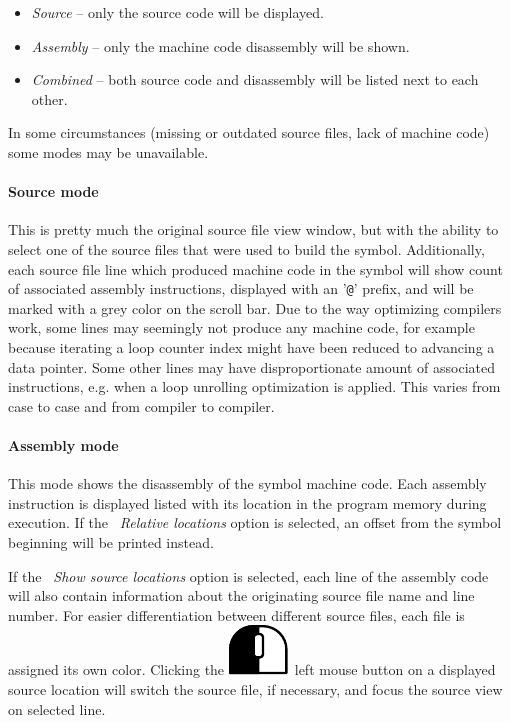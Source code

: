 \documentclass[hidelinks,titlepage,a4paper]{article}
\newcommand{\LMB}{\includegraphics[height=.8\baselineskip]{icons/lmb}}
\begin{document}
\begin{itemize}
\item \emph{Source} -- only the source code will be displayed.
\item \emph{Assembly} -- only the machine code disassembly will be shown.
\item \emph{Combined} -- both source code and disassembly will be listed next to each other.
\end{itemize}

In some circumstances (missing or outdated source files, lack of machine code) some modes may be unavailable.

\paragraph{Source mode}

This is pretty much the original source file view window, but with the ability to select one of the source files that were used to build the symbol. Additionally, each source file line which produced machine code in the symbol will show count of associated assembly instructions, displayed with an '\texttt{@}' prefix, and will be marked with a grey color on the scroll bar. Due to the way optimizing compilers work, some lines may seemingly not produce any machine code, for example because iterating a loop counter index might have been reduced to advancing a data pointer. Some other lines may have disproportionate amount of associated instructions, e.g. when a loop unrolling optimization is applied. This varies from case to case and from compiler to compiler.

\paragraph{Assembly mode}

This mode shows the disassembly of the symbol machine code. Each assembly instruction is displayed listed with its location in the program memory during execution. If the \emph{\faSearchLocation{}~Relative locations} option is selected, an offset from the symbol beginning will be printed instead.

If the \emph{\faFileImport{}~Show source locations} option is selected, each line of the assembly code will also contain information about the originating source file name and line number. For easier differentiation between different source files, each file is assigned its own color. Clicking the \LMB{}~left mouse button on a displayed source location will switch the source file, if necessary, and focus the source view on selected line.
\end{document}
